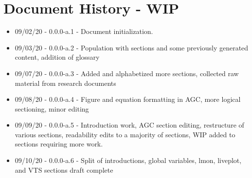 \chapter{Document History  - WIP}

\begin{itemize}
\itemsep 0em
\item 09/02/20 - 0.0.0-a.1 - Document initialization.
\item 09/03/20 - 0.0.0-a.2 - Population with sections and some previously generated content, addition of glossary
\item 09/07/20 - 0.0.0-a.3 - Added and alphabetized more sections, collected raw material from research documents
\item 09/08/20 - 0.0.0-a.4 - Figure and equation formatting in AGC, more logical sectioning, minor editing
\item 09/09/20 - 0.0.0-a.5 - Introduction work, AGC section editing, restructure of various sections, readability edits to a majority of sections, WIP added to sections requiring more work.
\item 09/10/20 - 0.0.0-a.6 - Split of introductions, global variables, lmon, liveplot, and VTS sections draft complete
\end{itemize}